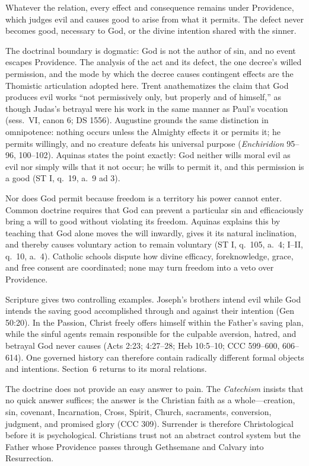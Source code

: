 Whatever the relation, every effect and consequence remains under Providence, which judges evil and causes good to arise from what it permits. The defect never becomes good, necessary to God, or the divine intention shared with the sinner.

The doctrinal boundary is dogmatic: God is not the author of sin, and no event escapes Providence. The analysis of the act and its defect, the one decree's willed permission, and the mode by which the decree causes contingent effects are the Thomistic articulation adopted here. Trent anathematizes the claim that God produces evil works ``not permissively only, but properly and of himself,'' as though Judas's betrayal were his work in the same manner as Paul's vocation (sess.~VI, canon 6; DS 1556). Augustine grounds the same distinction in omnipotence: nothing occurs unless the Almighty effects it or permits it; he permits willingly, and no creature defeats his universal purpose (\emph{Enchiridion} 95--96, 100--102). Aquinas states the point exactly: God neither wills moral evil as evil nor simply wills that it not occur; he wills to permit it, and this permission is a good (ST I, q.~19, a.~9 ad 3).

Nor does God permit because freedom is a territory his power cannot enter. Common doctrine requires that God can prevent a particular sin and efficaciously bring a will to good without violating its freedom. Aquinas explains this by teaching that God alone moves the will inwardly, gives it its natural inclination, and thereby causes voluntary action to remain voluntary (ST I, q.~105, a.~4; I--II, q.~10, a.~4). Catholic schools dispute how divine efficacy, foreknowledge, grace, and free consent are coordinated; none may turn freedom into a veto over Providence.

Scripture gives two controlling examples. Joseph's brothers intend evil while God intends the saving good accomplished through and against their intention (Gen 50:20). In the Passion, Christ freely offers himself within the Father's saving plan, while the sinful agents remain responsible for the culpable aversion, hatred, and betrayal God never causes (Acts 2:23; 4:27--28; Heb 10:5--10; CCC 599--600, 606--614). One governed history can therefore contain radically different formal objects and intentions. Section~6 returns to its moral relations.

The doctrine does not provide an easy answer to pain. The \emph{Catechism} insists that no quick answer suffices; the answer is the Christian faith as a whole---creation, sin, covenant, Incarnation, Cross, Spirit, Church, sacraments, conversion, judgment, and promised glory (CCC 309). Surrender is therefore Christological before it is psychological. Christians trust not an abstract control system but the Father whose Providence passes through Gethsemane and Calvary into Resurrection.
